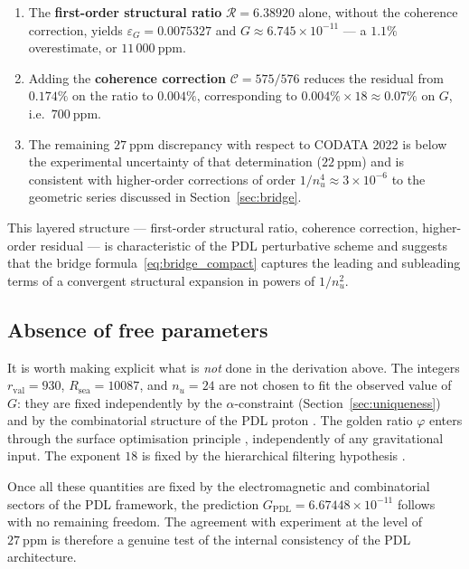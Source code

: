 \documentclass[11pt,a4paper]{article}
\begin{document}
\begin{enumerate}

\item The \textbf{first-order structural ratio} $\mathcal{R} = 6.38920$ alone, without the coherence correction, yields $\varepsilon_G = 0.0075327$ and $G \approx 6.745 \times 10^{-11}$ --- a $1.1\%$ overestimate, or $11\,000\ \mathrm{ppm}$.

\item Adding the \textbf{coherence correction} $\mathcal{C} = 575/576$ reduces the residual from $0.174\%$ on the ratio to $0.004\%$, corresponding to $0.004\% \times 18 \approx 0.07\%$ on $G$, i.e.\ $700\ \mathrm{ppm}$.

\item The remaining $27\ \mathrm{ppm}$ discrepancy with respect to CODATA 2022 is below the experimental uncertainty of that determination ($22\ \mathrm{ppm}$) and is consistent with higher-order corrections of order $1/n_u^4 \approx 3\times 10^{-6}$ to the geometric series discussed in Section~\ref{sec:bridge}.

\end{enumerate}

This layered structure --- first-order structural ratio, coherence correction, higher-order residual --- is characteristic of the PDL perturbative scheme and suggests that the bridge formula~\eqref{eq:bridge_compact} captures the leading and subleading terms of a convergent structural expansion in powers of $1/n_u^2$.

\subsection{Absence of free parameters}

It is worth making explicit what is \emph{not} done in the derivation above. The integers $r_{\mathrm{val}} = 930$, $R_{\mathrm{sea}} = 10087$, and $n_u = 24$ are not chosen to fit the observed value of $G$: they are fixed independently by the $\alpha$-constraint (Section~\ref{sec:uniqueness}) and by the combinatorial structure of the PDL proton \cite{Combinatorial_Proton_v2_2026}. The golden ratio $\varphi$ enters through the surface optimisation principle \cite{Golden_Ratio_PDL_2026}, independently of any gravitational input. The exponent $18$ is fixed by the hierarchical filtering hypothesis \cite{Exponent_18_PDL_2026}.

Once all these quantities are fixed by the electromagnetic and combinatorial sectors of the PDL framework, the prediction $G_{\mathrm{PDL}} = 6.67448 \times 10^{-11}$ follows with no remaining freedom. The agreement with experiment at the level of $27\ \mathrm{ppm}$ is therefore a genuine test of the internal consistency of the PDL architecture.
\end{document}
